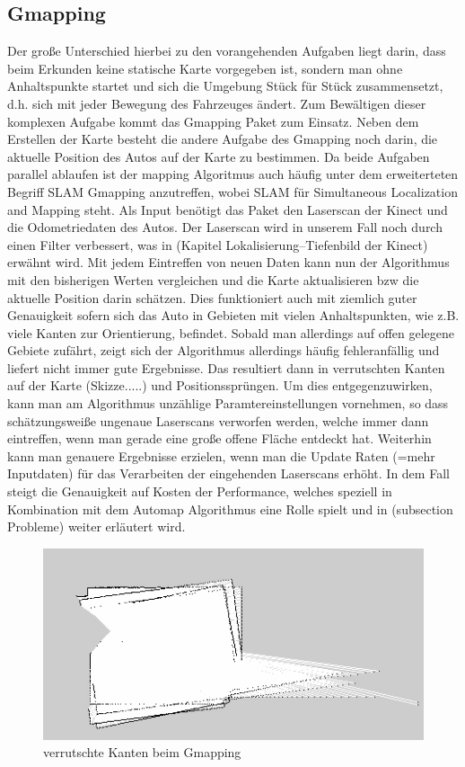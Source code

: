 \documentclass{article}
\begin{document}
\subsection{Gmapping}
\label{subsec:gmapping}
Der große Unterschied hierbei zu den vorangehenden Aufgaben liegt darin, dass beim Erkunden keine statische Karte vorgegeben ist, sondern man ohne Anhaltspunkte startet und sich die Umgebung Stück für Stück zusammensetzt, d.h. sich mit jeder Bewegung des Fahrzeuges ändert. Zum Bewältigen dieser komplexen Aufgabe kommt das Gmapping Paket zum Einsatz. Neben dem Erstellen der Karte besteht die andere Aufgabe des Gmapping noch darin, die aktuelle Position des Autos auf der Karte zu bestimmen. Da beide Aufgaben parallel ablaufen ist der mapping Algoritmus auch häufig unter dem erweiterteten Begriff SLAM Gmapping anzutreffen, wobei SLAM für Simultaneous Localization and Mapping steht. Als Input benötigt das Paket den Laserscan der Kinect und die Odometriedaten des Autos. Der Laserscan wird in unserem Fall noch durch einen Filter verbessert, was in (Kapitel Lokalisierung--Tiefenbild der Kinect) erwähnt wird. Mit jedem Eintreffen von neuen Daten kann nun der Algorithmus mit den bisherigen Werten vergleichen und die Karte aktualisieren bzw die aktuelle Position darin schätzen. Dies funktioniert auch mit ziemlich guter Genauigkeit sofern sich das Auto in Gebieten mit vielen Anhaltspunkten, wie z.B. viele Kanten zur Orientierung, befindet. Sobald man allerdings auf offen gelegene Gebiete zufährt, zeigt sich der Algorithmus allerdings häufig fehleranfällig und liefert nicht immer gute Ergebnisse. Das resultiert dann in verrutschten Kanten auf der Karte (Skizze.....) und Positionssprüngen. Um dies entgegenzuwirken, kann man am Algorithmus unzählige Paramtereinstellungen vornehmen, so dass schätzungsweiße ungenaue Laserscans verworfen werden, welche immer dann eintreffen, wenn man gerade eine große offene Fläche entdeckt hat. Weiterhin kann man genauere Ergebnisse erzielen, wenn man die Update Raten (=mehr Inputdaten) für das Verarbeiten der eingehenden Laserscans erhöht. In dem Fall steigt die Genauigkeit auf Kosten der Performance, welches speziell in Kombination mit dem Automap Algorithmus eine Rolle spielt und in (subsection Probleme) weiter erläutert wird. 
\begin{figure}[h]
  \centering
     \includegraphics[width=1.0\textwidth]{Includes/gmap.jpg}
  \caption{verrutschte Kanten beim Gmapping}
  \label{fig:Mapping}
\end{figure}
\end{document}
